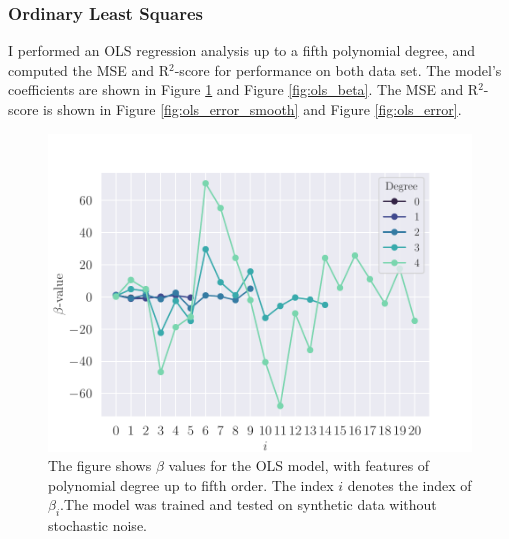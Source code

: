\subsubsection{Ordinary Least Squares}\label{sssec:ols_synthetic}
I performed an OLS regression analysis up to a fifth polynomial degree, and computed the MSE and R$^{2}$-score for performance on both data set. The model's coefficients are shown in Figure \ref{fig:ols_beta_smooth} and Figure \ref{fig:ols_beta}. The MSE and R$^{2}$-score is shown in Figure \ref{fig:ols_error_smooth} and Figure \ref{fig:ols_error}.
\begin{figure}[h]
    \centering
    \includegraphics[width=\linewidth]{project-1/latex/figures/ols_beta_smooth_N50.pdf}
    \caption{The figure shows $\beta$ values for the OLS model, with features of polynomial degree up to fifth order. The index $i$ denotes the index of $\beta_{i}$.The model was trained and tested on synthetic data without stochastic noise.}
    \label{fig:ols_beta_smooth}
\end{figure}
